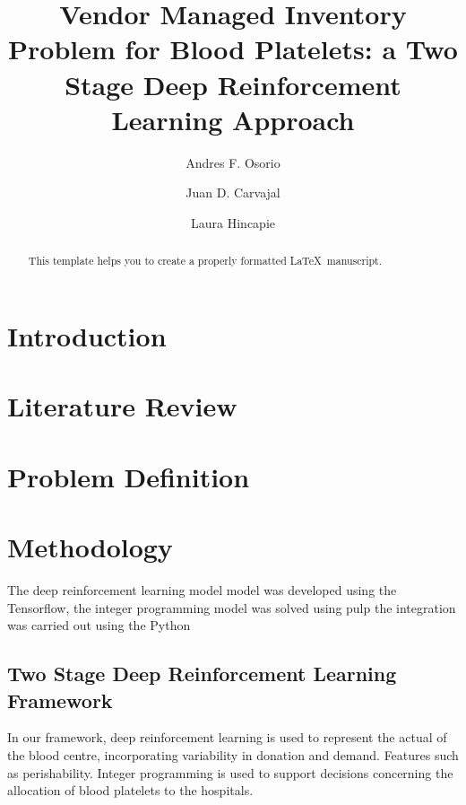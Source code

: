 \documentclass{paper}
\begin{document}
\begin{frontmatter}

\title{Vendor Managed Inventory Problem for Blood Platelets: a Two Stage Deep Reinforcement Learning Approach}

\author[1]{Andres F. Osorio}
\author[2]{Juan D. Carvajal}
\author[3]{Laura Hincapie}

\address[1]{afosorio@icesi.edu.co}
\address[2]{juan030698@hotmail.com}
\address[3]{lauhincapie97@gmail.com}

\begin{abstract}
This template helps you to create a properly formatted \LaTeX\ manuscript.
\end{abstract}


\end{frontmatter}


\section{Introduction}

\section{Literature Review}

\section{Problem Definition}

\section{Methodology}

		The deep reinforcement learning model model was developed using the Tensorflow, the integer programming model was solved using pulp the integration was carried out using the Python
		
	\subsection{Two Stage Deep Reinforcement Learning Framework}
	
	In our framework, deep reinforcement learning is used to represent the actual of the blood centre, incorporating variability in donation and demand. Features such as perishability. Integer programming is used to support decisions concerning the allocation of blood platelets to the hospitals.
\end{document}
